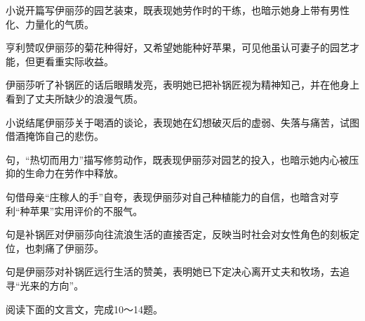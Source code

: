 \documentclass[11pt,a4paper]{ctexart}
\begin{document}
\begin{choices}
\item 小说开篇写伊丽莎的园艺装束，既表现她劳作时的干练，也暗示她身上带有男性化、力量化的气质。
\item 亨利赞叹伊丽莎的菊花种得好，又希望她能种好苹果，可见他虽认可妻子的园艺才能，但更看重实际收益。
\item 伊丽莎听了补锅匠的话后眼睛发亮，表明她已把补锅匠视为精神知己，并在他身上看到了丈夫所缺少的浪漫气质。
\item 小说结尾伊丽莎关于喝酒的谈论，表现她在幻想破灭后的虚弱、失落与痛苦，试图借酒掩饰自己的悲伤。
\end{choices}

\begin{choices}
\item 句，“热切而用力”描写修剪动作，既表现伊丽莎对园艺的投入，也暗示她内心被压抑的生命力在劳作中释放。
\item 句借母亲“庄稼人的手”自夸，表现伊丽莎对自己种植能力的自信，也暗含对亨利“种苹果”实用评价的不服气。
\item 句是补锅匠对伊丽莎向往流浪生活的直接否定，反映当时社会对女性角色的刻板定位，也刺痛了伊丽莎。
\item 句是伊丽莎对补锅匠远行生活的赞美，表明她已下定决心离开丈夫和牧场，去追寻“光来的方向”。
\end{choices}


\par\vspace{2.2em}


\par\vspace{2.2em}

阅读下面的文言文，完成10～14题。
\end{document}
